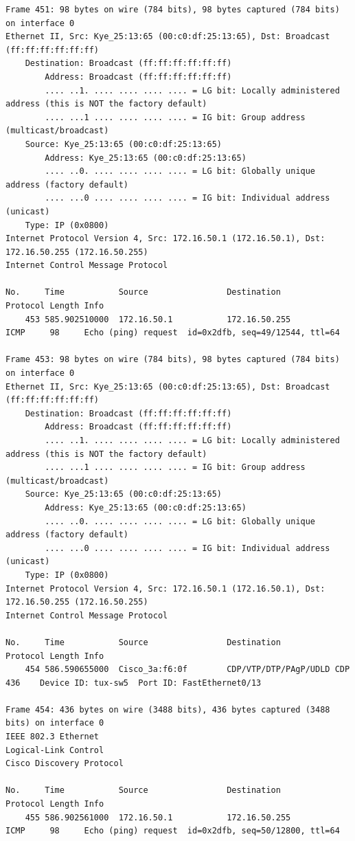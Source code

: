 \documentclass[a4paper,11pt]{article}
\begin{document}
\begin{lstlisting}
Frame 451: 98 bytes on wire (784 bits), 98 bytes captured (784 bits) on interface 0
Ethernet II, Src: Kye_25:13:65 (00:c0:df:25:13:65), Dst: Broadcast (ff:ff:ff:ff:ff:ff)
    Destination: Broadcast (ff:ff:ff:ff:ff:ff)
        Address: Broadcast (ff:ff:ff:ff:ff:ff)
        .... ..1. .... .... .... .... = LG bit: Locally administered address (this is NOT the factory default)
        .... ...1 .... .... .... .... = IG bit: Group address (multicast/broadcast)
    Source: Kye_25:13:65 (00:c0:df:25:13:65)
        Address: Kye_25:13:65 (00:c0:df:25:13:65)
        .... ..0. .... .... .... .... = LG bit: Globally unique address (factory default)
        .... ...0 .... .... .... .... = IG bit: Individual address (unicast)
    Type: IP (0x0800)
Internet Protocol Version 4, Src: 172.16.50.1 (172.16.50.1), Dst: 172.16.50.255 (172.16.50.255)
Internet Control Message Protocol

No.     Time           Source                Destination           Protocol Length Info
    453 585.902510000  172.16.50.1           172.16.50.255         ICMP     98     Echo (ping) request  id=0x2dfb, seq=49/12544, ttl=64

Frame 453: 98 bytes on wire (784 bits), 98 bytes captured (784 bits) on interface 0
Ethernet II, Src: Kye_25:13:65 (00:c0:df:25:13:65), Dst: Broadcast (ff:ff:ff:ff:ff:ff)
    Destination: Broadcast (ff:ff:ff:ff:ff:ff)
        Address: Broadcast (ff:ff:ff:ff:ff:ff)
        .... ..1. .... .... .... .... = LG bit: Locally administered address (this is NOT the factory default)
        .... ...1 .... .... .... .... = IG bit: Group address (multicast/broadcast)
    Source: Kye_25:13:65 (00:c0:df:25:13:65)
        Address: Kye_25:13:65 (00:c0:df:25:13:65)
        .... ..0. .... .... .... .... = LG bit: Globally unique address (factory default)
        .... ...0 .... .... .... .... = IG bit: Individual address (unicast)
    Type: IP (0x0800)
Internet Protocol Version 4, Src: 172.16.50.1 (172.16.50.1), Dst: 172.16.50.255 (172.16.50.255)
Internet Control Message Protocol

No.     Time           Source                Destination           Protocol Length Info
    454 586.590655000  Cisco_3a:f6:0f        CDP/VTP/DTP/PAgP/UDLD CDP      436    Device ID: tux-sw5  Port ID: FastEthernet0/13  

Frame 454: 436 bytes on wire (3488 bits), 436 bytes captured (3488 bits) on interface 0
IEEE 802.3 Ethernet 
Logical-Link Control
Cisco Discovery Protocol

No.     Time           Source                Destination           Protocol Length Info
    455 586.902561000  172.16.50.1           172.16.50.255         ICMP     98     Echo (ping) request  id=0x2dfb, seq=50/12800, ttl=64


\end{lstlisting}
\end{document}

